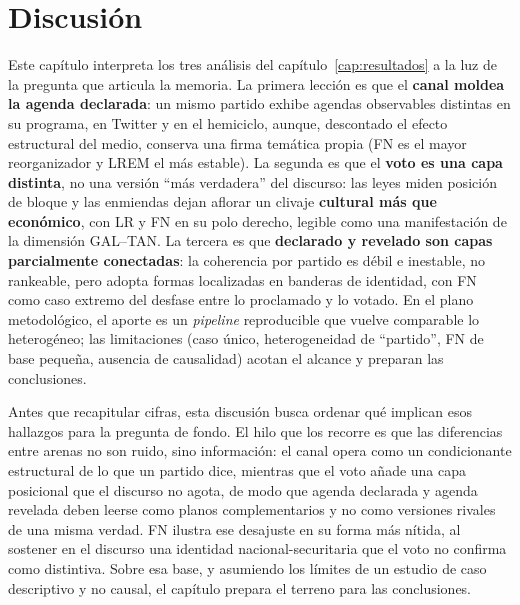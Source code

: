 \chapter{Discusión}
\label{cap:discusion}


Este capítulo interpreta los tres análisis del capítulo~\ref{cap:resultados} a la
luz de la pregunta que articula la memoria. La primera lección es que el
\textbf{canal moldea la agenda declarada}: un mismo partido exhibe agendas
observables distintas en su programa, en Twitter y en el hemiciclo, aunque,
descontado el efecto estructural del medio, conserva una firma temática propia
(FN es el mayor reorganizador y LREM el más estable). La segunda es que el
\textbf{voto es una capa distinta}, no una versión ``más verdadera'' del discurso:
las leyes miden posición de bloque y las enmiendas dejan aflorar un clivaje
\textbf{cultural más que económico}, con LR y FN en su polo derecho, legible como
una manifestación de la dimensión GAL--TAN. La tercera es que \textbf{declarado y
revelado son capas parcialmente conectadas}: la coherencia por partido es débil e
inestable, no rankeable, pero adopta formas localizadas en banderas de
identidad, con FN como caso extremo del desfase entre lo proclamado y lo votado.
En el plano metodológico, el aporte es un \emph{pipeline} reproducible que vuelve
comparable lo heterogéneo; las limitaciones (caso único, heterogeneidad de
``partido'', FN de base pequeña, ausencia de causalidad) acotan el alcance y
preparan las conclusiones.

Antes que recapitular cifras, esta discusión busca ordenar qué implican esos
hallazgos para la pregunta de fondo. El hilo que los recorre es que las
diferencias entre arenas no son ruido, sino información: el canal opera como un
condicionante estructural de lo que un partido dice, mientras que el voto añade
una capa posicional que el discurso no agota, de modo que agenda declarada y
agenda revelada deben leerse como planos complementarios y no como versiones
rivales de una misma verdad. FN ilustra ese desajuste en su forma más nítida, al
sostener en el discurso una identidad nacional-securitaria que el voto no
confirma como distintiva. Sobre esa base, y asumiendo los límites de un estudio
de caso descriptivo y no causal, el capítulo prepara el terreno para las
conclusiones.


